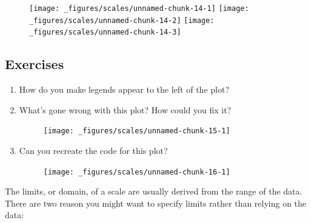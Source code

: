 \begin{figure}[H]
  \texttt{[image: \_figures/scales/unnamed-chunk-14-1]}%
  \texttt{[image: \_figures/scales/unnamed-chunk-14-2]}%
  \texttt{[image: \_figures/scales/unnamed-chunk-14-3]}
\end{figure}

\subsection{Exercises}

\begin{enumerate}
\def\labelenumi{\arabic{enumi}.}
\item
  How do you make legends appear to the left of the plot?
\item
  What's gone wrong with this plot? How could you fix it?

\begin{Shaded}
\begin{Highlighting}[]
\StringTok{ }
\StringTok{  }\NormalTok{(}\NormalTok{(}  \StringTok{ }
\StringTok{  }\NormalTok{(}\NormalTok{)}
\end{Highlighting}
\end{Shaded}

  \begin{figure}[H]
    \centering
    \texttt{[image: \_figures/scales/unnamed-chunk-15-1]}
  \end{figure}
\item
  Can you recreate the code for this plot?

  \begin{figure}[H]
    \centering
    \texttt{[image: \_figures/scales/unnamed-chunk-16-1]}
  \end{figure}
\end{enumerate}


The limits, or domain, of a scale are usually derived from the range of
the data.   There are two reason
you might want to specify limits rather than relying on the data:

